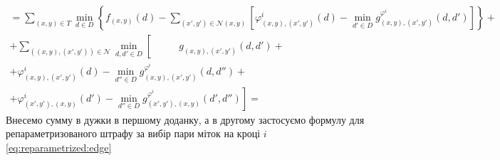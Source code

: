 \begin{equation*}
\begin{gathered}
    = \sum \limits_{\left(x, y \right) \in T}
        \min \limits_{d \in D} \left\{
            f_{ \left(x, y \right)} \left(d \right) -
            \sum \limits_{\left(x', y' \right) \in \mathcal{N} \left(x, y \right)}
            \left[
                \varphi_{ \left(x, y \right), \left(x', y' \right)}^i
                    \left(d \right) -
                \min \limits_{d' \in D}
                    g_{\left(x, y \right), \left(x', y' \right)}^{\varphi^i}
                        \left( d, d' \right)
            \right]
        \right\} + \\
    + \sum \limits_{\left(\left(x, y \right), \left(x', y' \right) \right) \in \mathcal{N}}
        \min \limits_{d, d' \in D} \left[ \phantom{\min \limits_{d'' \in D}}
            g_{\left(x, y \right), \left(x', y' \right)} \left(d, d' \right) + \right. \\
            + \varphi_{\left(x, y \right), \left(x', y' \right)}^i
                \left(d \right) -
            \min \limits_{d'' \in D}
                g_{\left(x, y \right), \left(x', y' \right)}^{\varphi^i}
                    \left(d, d'' \right) + \\
            \left. + \varphi_{\left(x', y' \right), \left(x, y \right)}^i
                \left(d' \right) -
            \min \limits_{d'' \in D}
                g_{\left(x', y' \right), \left(x, y \right)}^{\varphi^i}
                    \left(d', d'' \right)
        \right] =
\end{gathered}
\end{equation*}
Внесемо сумму в дужки в першому доданку,
а в другому застосуємо формулу для репараметризованого
штрафу за вибір пари міток на кроці $i$ \eqref{eq:reparametrized:edge}
